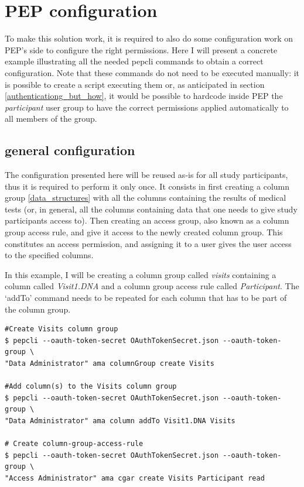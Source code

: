 \documentclass{report}
\begin{document}
\section{PEP configuration}\label{pep_configuration}
To make this solution work, it is required to also do some configuration work on PEP's side to configure the right permissions. Here I will present a concrete example illustrating
all the needed pepcli commands to obtain a correct configuration. Note that these commands do not need to be executed manually: it is possible to create a script executing them or,
as anticipated in section \ref{authenticationg_but_how}, it would be possible to hardcode inside PEP the \textit{participant} user group to have the correct permissions applied
automatically to all members of the group.

\subsection{general configuration}
The configuration presented here will be reused as-is for all study participants, thus it is required to perform it only once. It consists in first creating a column group
\ref{data_structures} with all the columns containing the results of medical tests (or, in general, all the columns containing data that one needs to give study participants access
to). Then creating an access group, also known as a column group access rule, and give it access to the newly created column group. This constitutes an access permission, and
assigning it to a user gives the user access to the specified columns. \par
In this example, I will be creating a column group called \textit{visits} containing a column called \textit{Visit1.DNA} and a column group access rule called \textit{Participant}. The 
\enquote*{addTo} command needs to be repeated for each column that has to be part of the column group. 

\begin{verbatim}
#Create Visits column group
$ pepcli --oauth-token-secret OAuthTokenSecret.json --oauth-token-group \
"Data Administrator" ama columnGroup create Visits

#Add column(s) to the Visits column group
$ pepcli --oauth-token-secret OAuthTokenSecret.json --oauth-token-group \
"Data Administrator" ama column addTo Visit1.DNA Visits

# Create column-group-access-rule
$ pepcli --oauth-token-secret OAuthTokenSecret.json --oauth-token-group \
"Access Administrator" ama cgar create Visits Participant read
\end{verbatim}
\end{document}
